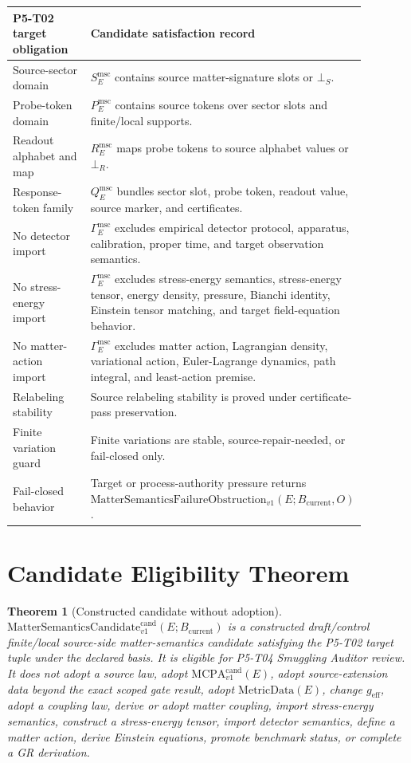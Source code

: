 \documentclass[11pt]{article}
\newcommand{\MetricData}{\mathrm{MetricData}}
\newcommand{\geff}{g_{\mathrm{eff}}}
\newcommand{\MCPA}{\mathrm{MCPA}^{\mathrm{cand}}_{v1}}
\newcommand{\Bcur}{B_{\mathrm{current}}}
\newcommand{\FailureObs}{\mathrm{MatterSemanticsFailureObstruction}_{v1}}
\newcommand{\MSCand}{\mathrm{MatterSemanticsCandidate}^{\mathrm{cand}}_{v1}}
\newcommand{\BottomS}{\bot_S}
\newcommand{\BottomR}{\bot_R}
\newtheorem{theorem}{Theorem}
\begin{document}
\begin{longtable}{p{0.30\linewidth}p{0.58\linewidth}}
\toprule
P5-T02 target obligation & Candidate satisfaction record \\
\midrule
Source-sector domain & \(S_E^{\mathrm{msc}}\) contains source matter-signature slots or \(\BottomS\). \\
Probe-token domain & \(P_E^{\mathrm{msc}}\) contains source tokens over sector slots and finite/local supports. \\
Readout alphabet and map & \(R_E^{\mathrm{msc}}\) maps probe tokens to source alphabet values or \(\BottomR\). \\
Response-token family & \(Q_E^{\mathrm{msc}}\) bundles sector slot, probe token, readout value, source marker, and certificates. \\
No detector import & \(\Gamma_E^{\mathrm{msc}}\) excludes empirical detector protocol, apparatus, calibration, proper time, and target observation semantics. \\
No stress-energy import & \(\Gamma_E^{\mathrm{msc}}\) excludes stress-energy semantics, stress-energy tensor, energy density, pressure, Bianchi identity, Einstein tensor matching, and target field-equation behavior. \\
No matter-action import & \(\Gamma_E^{\mathrm{msc}}\) excludes matter action, Lagrangian density, variational action, Euler-Lagrange dynamics, path integral, and least-action premise. \\
Relabeling stability & Source relabeling stability is proved under certificate-pass preservation. \\
Finite variation guard & Finite variations are stable, source-repair-needed, or fail-closed only. \\
Fail-closed behavior & Target or process-authority pressure returns \(\FailureObs(E;\Bcur,O)\). \\
\bottomrule
\end{longtable}

\section{Candidate Eligibility Theorem}

\begin{theorem}[Constructed candidate without adoption]
\(\MSCand(E;\Bcur)\) is a constructed draft/control finite/local
source-side matter-semantics candidate satisfying the P5-T02 target tuple
under the declared basis. It is eligible for P5-T04 Smuggling Auditor review.
It does not adopt a source law, adopt \(\MCPA(E)\), adopt source-extension data
beyond the exact scoped gate result, adopt \(\MetricData(E)\), change
\(\geff\), adopt a coupling law, derive or adopt matter coupling, import
stress-energy semantics, construct a stress-energy tensor, import detector
semantics, define a matter action, derive Einstein equations, promote
benchmark status, or complete a GR derivation.
\end{theorem}
\end{document}
